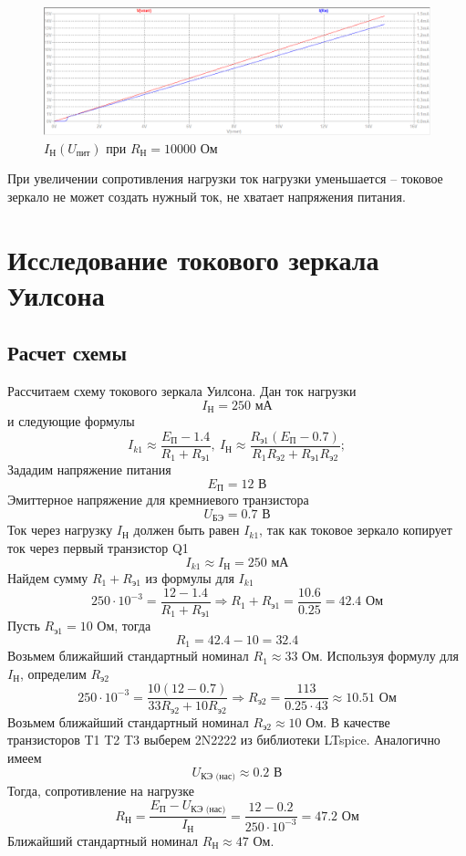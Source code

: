 \documentclass[a4paper, 12pt]{article}
\begin{document}
    \begin{figure}[H]
        \centering
        \includegraphics[scale=0.46]{1task_Iн(Vпит)_Rн10000.png}
        \captionsetup{skip=0pt}
        \caption{$I_\text{Н}\left( U_\text{пит} \right)$ при $R_\text{Н}=10000$ Ом}
        \label{fig:1task_InVlR10000}
    \end{figure}
    \noindent При увеличении сопротивления нагрузки ток нагрузки уменьшается -- токовое зеркало не может создать нужный ток,
    не хватает напряжения питания.


    \section{Исследование токового зеркала Уилсона}
    \subsection{Расчет схемы}
    Рассчитаем схему токового зеркала Уилсона. Дан ток нагрузки
    $$
    I_\text{Н}=250\text{ мА}
    $$
    и следующие формулы
    $$
    I_{k1}\approx\dfrac{E_\text{П}-1.4}{R_1+R_\text{э1}},\ I_\text{Н}\approx\dfrac{R_\text{э1}\left( E_\text{П}-0.7 \right)}{R_1R_\text{э2}+R_\text{э1}R_\text{э2}};
    $$
    Зададим напряжение питания $$E_\text{П}=12\text{ В}$$
    Эмиттерное напряжение для кремниевого транзистора
    $$
    U_\text{БЭ}=0.7\text{ В}
    $$
    Ток через нагрузку $I_\text{Н}$ должен быть равен $I_{k1}$, так как токовое зеркало копирует ток через первый транзистор Q1
    $$
    I_{k1}\approx I_\text{Н}=250\text{ мА}
    $$
    Найдем сумму $R_1+R_\text{э1}$ из формулы для $I_{k1}$
    $$
    250\cdot10^{-3}=\dfrac{12-1.4}{R_1+R_\text{э1}}\Rightarrow R_1+R_\text{э1}=\dfrac{10.6}{0.25}=42.4\text{ Ом}
    $$
    Пусть $R_\text{э1}=10$ Ом, тогда
    $$
    R_1=42.4-10=32.4
    $$
    Возьмем ближайший стандартный номинал $R_1\approx33$ Ом. Используя формулу для $I_\text{Н}$,
    определим $R_\text{э2}$
    $$
    250\cdot10^{-3}=\dfrac{10\left( 12-0.7 \right)}{33R_\text{э2}+10R_\text{э2}}\Rightarrow R_\text{э2}=\dfrac{113}{0.25\cdot43}\approx10.51\text{ Ом}
    $$
    Возьмем ближайший стандартный номинал $R_\text{э2}\approx10$ Ом. В качестве транзисторов T1 T2 T3 выберем 2N2222
    из библиотеки LTspice. Аналогично имеем
    $$
    U_\text{КЭ (нас)}\approx0.2\text{ В}
    $$
    Тогда, сопротивление на нагрузке
    $$
    R_\text{Н}=\dfrac{E_\text{П}-U_\text{КЭ (нас)}}{I_\text{Н}}=\dfrac{12-0.2}{250\cdot10^{-3}}=47.2\text{ Ом}
    $$
    Ближайший стандартный номинал $R_\text{Н}\approx47$ Ом.
\end{document}
